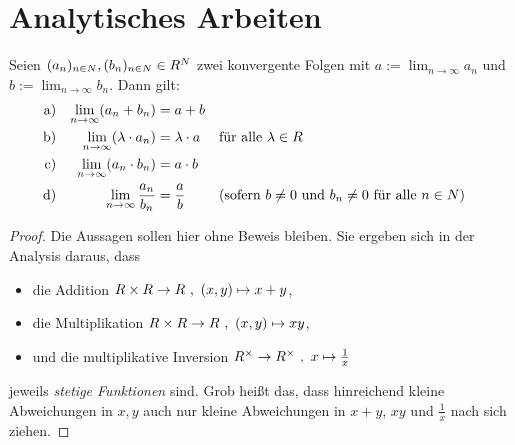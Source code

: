 \section{Analytisches Arbeiten}


\begin{satz} \label{konvergenzregeln}
    Seien $(a_n)_{n\in \relax N},(b_n)_{n\in \relax N}\in \relax R^\relax N$ zwei konvergente Folgen mit $a:=\lim_{n\to\infty}a_n$ und $b:=\lim_{n\to\infty}b_n$. Dann gilt:
    \begin{align*}
        \textnormal{a)} && \lim_{n\to\infty}(a_n+b_n) & = a+b \\
        \textnormal{b)} && \lim_{n\to\infty}(\lambda \cdot a_n) & = \lambda \cdot a && \textnormal{für alle}\ \lambda\in\relax R \\
        \textnormal{c)} && \lim_{n\to\infty}(a_n\cdot b_n) & = a\cdot b \\
        \textnormal{d)} && \lim_{n\to\infty}\frac{a_n}{b_n} & = \frac{a}{b} && (\textnormal{sofern $b\neq 0$ und $b_n\neq 0$ für alle $n\in \relax N$})
    \end{align*}
\end{satz}
\begin{proof}\let\qed\relax
    Die Aussagen sollen hier ohne Beweis bleiben. Sie ergeben sich in der Analysis daraus, dass
    \begin{itemize}
        \item die Addition $\R\times \R\to \R \ ,\ (x,y)\mapsto x+y$,
        \item die Multiplikation $\R\times \R\to \R \ ,\ (x,y)\mapsto xy$,
        \item und die multiplikative Inversion $\relax R^\times \to \relax R^\times \ ,\ x\mapsto \frac{1}{x}$
    \end{itemize}
    jeweils \emph{stetige Funktionen} sind. Grob heißt das, dass hinreichend kleine Abweichungen in $x,y$ auch nur kleine Abweichungen in $x+y$, $xy$ und $\frac{1}{x}$ nach sich ziehen.
\end{proof}


